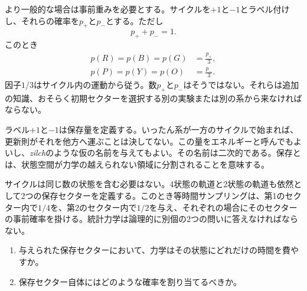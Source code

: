 より一般的な場合は事前重みを必要とする。サイクルを\(+1\)と\(-1\)とラベル付けし、それらの確率を\(p_+\)と\(p_-\)とする。ただし
\begin{equation}
 p_++p_-=1.
\end{equation}
このとき
\begin{align}
 p(R)=p(B)=p(G)&=\frac{p_+}{3},\\
 p(P)=p(Y)=p(O)&=\frac{p_-}{3}.
 \label{eq:sm1-sector-weights}
\end{align}
因子\(1/3\)はサイクル内の運動から従う。数\(p_+\)と\(p_-\)はそうではない。それらは追加の知識、おそらく初期セクターを選択する別の実験または別の系から来なければならない。

ラベル\(+1\)と\(-1\)は保存量を定義する。いったん系が一方のサイクルで始まれば、更新則がそれを他方へ運ぶことは決してない。この量をエネルギーと呼んでもよいし、\emph{zilch}のような仮の名前を与えてもよい。その名前は二次的である。保存とは、状態空間が力学の越えられない領域に分割されることを意味する。

サイクルは同じ数の状態を含む必要はない。4状態の軌道と2状態の軌道も依然として2つの保存セクターを定義する。このとき等時間サンプリングは、第1のセクター内で\(1/4\)を、第2のセクター内で\(1/2\)を与え、それぞれの場合にそのセクターの事前確率を掛ける。統計力学は論理的に別個の2つの問いに答えなければならない。
\begin{enumerate}
\item 与えられた保存セクターにおいて、力学はその状態にどれだけの時間を費やすか。
\item 保存セクター自体にはどのような確率を割り当てるべきか。
\end{enumerate}

\begin{classroomqa}
\end{classroomqa}

\begin{classroomqa}
\end{classroomqa}

